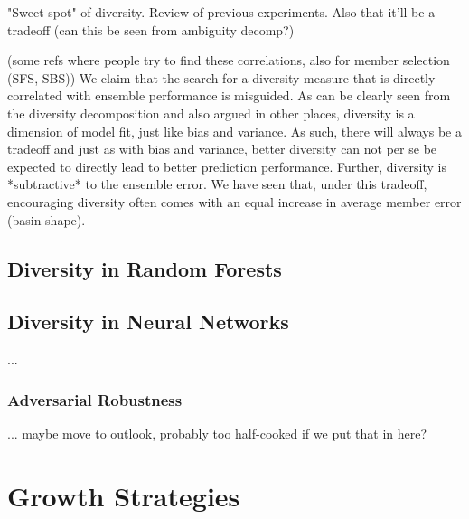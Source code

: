 \documentclass[
    a4paper, %
	fontsize=10pt, %
	twoside=false, %
]{kaobook}
\begin{document}
\begin{titlepage}
"Sweet spot" of diversity. Review of previous experiments. 
Also that it'll be a tradeoff (can this be seen from ambiguity decomp?)

(some refs where people try to find these correlations, also for member selection (SFS, SBS))
We claim that the search for a diversity measure that is directly correlated with ensemble performance is misguided. As can be clearly seen from the diversity decomposition and also argued in other places, diversity is a dimension of model fit, just like bias and variance. As such, there will always be a tradeoff and just as with bias and variance, better diversity can not per se be expected to directly lead to better prediction performance. Further, diversity is *subtractive* to the ensemble error. We have seen that, under this tradeoff, encouraging diversity often comes with an equal increase in average member error (basin shape). 

\section{Diversity in Random Forests}





\section{Diversity in Neural Networks}

...

\subsection{Adversarial Robustness}

... maybe move to outlook, probably too half-cooked if we put that in here?


\chapter{Growth Strategies}


\end{titlepage}
\end{document}
